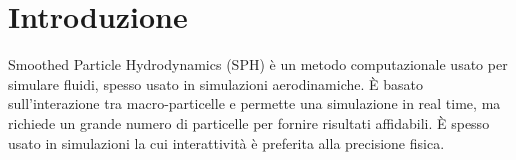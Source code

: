 \section{Introduzione}
    Smoothed Particle Hydrodynamics (SPH) è un metodo computazionale usato per
    simulare fluidi, spesso usato in simulazioni aerodinamiche. È basato 
    sull'interazione tra macro-particelle e permette una simulazione in real time, ma
    richiede un grande numero di particelle per fornire risultati affidabili.
    È spesso usato in simulazioni la cui interattività è preferita alla precisione
    fisica.